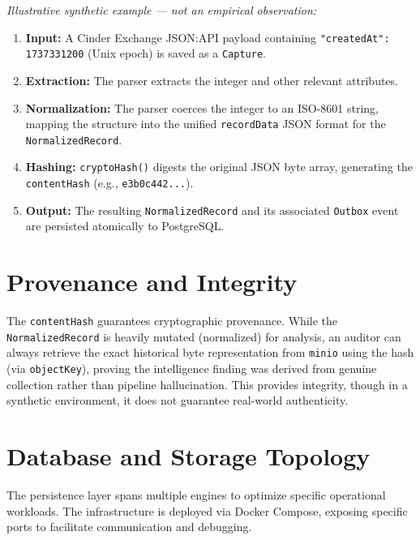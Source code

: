 \textit{Illustrative synthetic example — not an empirical observation:}
\begin{enumerate}
    \item \textbf{Input:} A Cinder Exchange JSON:API payload containing \texttt{"createdAt": 1737331200} (Unix epoch) is saved as a \texttt{Capture}.
    \item \textbf{Extraction:} The parser extracts the integer and other relevant attributes.
    \item \textbf{Normalization:} The parser coerces the integer to an ISO-8601 string, mapping the structure into the unified \texttt{recordData} JSON format for the \texttt{NormalizedRecord}.
    \item \textbf{Hashing:} \texttt{cryptoHash()} digests the original JSON byte array, generating the \texttt{contentHash} (e.g., \texttt{e3b0c442...}).
    \item \textbf{Output:} The resulting \texttt{NormalizedRecord} and its associated \texttt{Outbox} event are persisted atomically to PostgreSQL.
\end{enumerate}

\section{Provenance and Integrity}
\label{sec:data-provenance}
The \texttt{contentHash} guarantees cryptographic provenance. While the \texttt{NormalizedRecord} is heavily mutated (normalized) for analysis, an auditor can always retrieve the exact historical byte representation from \texttt{minio} using the hash (via \texttt{objectKey}), proving the intelligence finding was derived from genuine collection rather than pipeline hallucination. This provides integrity, though in a synthetic environment, it does not guarantee real-world authenticity.

\section{Database and Storage Topology}
\label{sec:data-storage-topology}
The persistence layer spans multiple engines to optimize specific operational workloads. The infrastructure is deployed via Docker Compose, exposing specific ports to facilitate communication and debugging.

